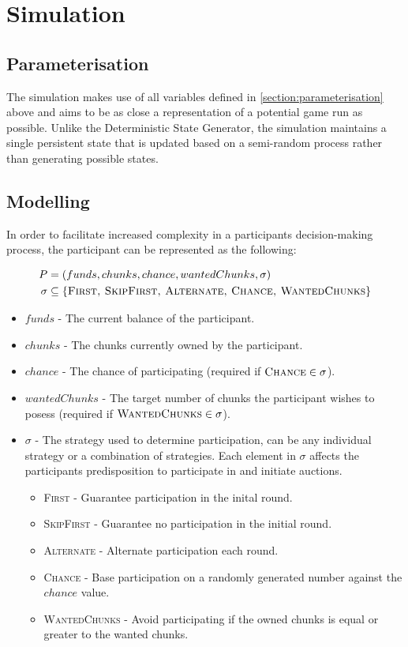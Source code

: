 \section{Simulation}

\subsection{Parameterisation}

The simulation makes use of all variables defined in \cref{section:parameterisation} above and aims to be as close a representation of a potential game run as possible. Unlike the Deterministic State Generator, the simulation maintains a single persistent state that is updated based on a semi-random process rather than generating possible states.

\subsection{Modelling}

In order to facilitate increased complexity in a participants decision-making process, the participant can be represented as the following:

\begin{align}
    P &= (funds, chunks, chance, wantedChunks, \sigma) \\
    \sigma &\subseteq \{\textsc{First, SkipFirst, Alternate, Chance, WantedChunks}\}
\end{align}

\begin{itemize}
    \item $funds$ - The current balance of the participant.
    \item $chunks$ - The chunks currently owned by the participant.
    \item $chance$ - The chance of participating (required if $\textsc{Chance} \in \sigma$).
    \item $wantedChunks$ - The target number of chunks the participant wishes to posess (required if $\textsc{WantedChunks} \in \sigma$).
    \item $\sigma$ - The strategy used to determine participation, can be any individual strategy or a combination of strategies. Each element in $\sigma$ affects the participants predisposition to participate in and initiate auctions.
    \begin{itemize}
        \item \textsc{First} - Guarantee participation in the inital round.
        \item \textsc{SkipFirst} - Guarantee no participation in the initial round.
        \item \textsc{Alternate} - Alternate participation each round.
        \item \textsc{Chance} - Base participation on a randomly generated number against the $chance$ value.
        \item \textsc{WantedChunks} - Avoid participating if the owned chunks is equal or greater to the wanted chunks.
    \end{itemize}
\end{itemize}

